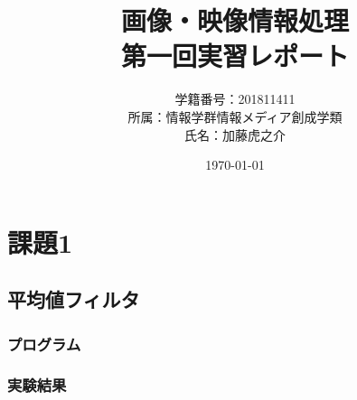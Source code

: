 \documentclass[a4paper,10pt,uplatex,dvipdfmx]{jsarticle}
\title{画像・映像情報処理\\ \huge 第一回実習レポート}
\author{学籍番号：201811411\\ 所属：情報学群情報メディア創成学類\\ 氏名：加藤虎之介}
\date{\today}
\begin{document}
\maketitle
\section{課題1}
\subsection{平均値フィルタ}
\subsubsection{プログラム}


\subsubsection{実験結果}
\end{document}
